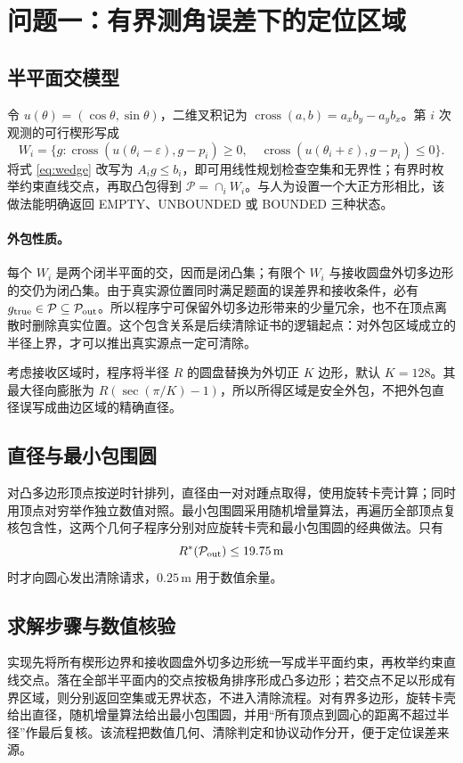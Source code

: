 \section{问题一：有界测角误差下的定位区域}
\subsection{半平面交模型}
令 $u(\theta)=(\cos\theta,\sin\theta)$，二维叉积记为 $\operatorname{cross}(a,b)=a_xb_y-a_yb_x$。第 $i$ 次观测的可行楔形写成
\begin{equation}\label{eq:wedge}
W_i=\{g:\operatorname{cross}(u(\theta_i-\varepsilon),g-p_i)\ge0,\quad \operatorname{cross}(u(\theta_i+\varepsilon),g-p_i)\le0\}.
\end{equation}
将式 \eqref{eq:wedge} 改写为 $A_i g\le b_i$，即可用线性规划检查空集和无界性；有界时枚举约束直线交点，再取凸包得到 $\mathcal P=\cap_iW_i$。与人为设置一个大正方形相比，该做法能明确返回 EMPTY、UNBOUNDED 或 BOUNDED 三种状态。

\paragraph{外包性质。}每个 $W_i$ 是两个闭半平面的交，因而是闭凸集；有限个 $W_i$ 与接收圆盘外切多边形的交仍为闭凸集。由于真实源位置同时满足题面的误差界和接收条件，必有 $g_{\rm true}\in\mathcal P\subseteq\mathcal P_{\rm out}$。所以程序宁可保留外切多边形带来的少量冗余，也不在顶点离散时删除真实位置。这个包含关系是后续清除证书的逻辑起点：对外包区域成立的半径上界，才可以推出真实源点一定可清除。

考虑接收区域时，程序将半径 $R$ 的圆盘替换为外切正 $K$ 边形，默认 $K=128$。其最大径向膨胀为 $R(\sec(\pi/K)-1)$，所以所得区域是安全外包，不把外包直径误写成曲边区域的精确直径。

\subsection{直径与最小包围圆}
对凸多边形顶点按逆时针排列，直径由一对对踵点取得，使用旋转卡壳计算；同时用顶点对穷举作独立数值对照。最小包围圆采用随机增量算法，再遍历全部顶点复核包含性，这两个几何子程序分别对应旋转卡壳和最小包围圆的经典做法\cite{toussaint,welzl}。只有
\begin{equation}\label{eq:clear-cert}
R^*(\mathcal P_{\rm out})\le 19.75\,\mathrm m
\end{equation}
时才向圆心发出清除请求，$0.25\,\mathrm m$ 用于数值余量。

\subsection{求解步骤与数值核验}
实现先将所有楔形边界和接收圆盘外切多边形统一写成半平面约束，再枚举约束直线交点。落在全部半平面内的交点按极角排序形成凸多边形；若交点不足以形成有界区域，则分别返回空集或无界状态，不进入清除流程。对有界多边形，旋转卡壳给出直径，随机增量算法给出最小包围圆，并用“所有顶点到圆心的距离不超过半径”作最后复核。该流程把数值几何、清除判定和协议动作分开，便于定位误差来源。

